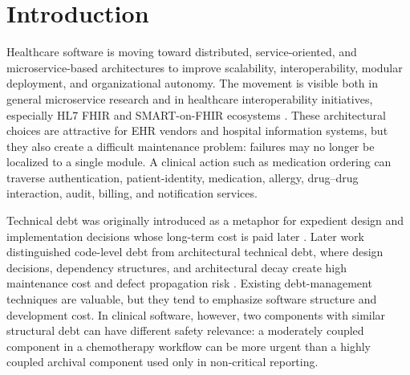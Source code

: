 \documentclass[english,preprint]{elsarticle}
\begin{document}
\begin{center}
\end{center}

\section{Introduction}\label{sec:introduction}

Healthcare software is moving toward distributed, service-oriented, and microservice-based architectures to improve scalability, interoperability, modular deployment, and organizational autonomy. The movement is visible both in general microservice research and in healthcare interoperability initiatives, especially HL7 FHIR and SMART-on-FHIR ecosystems \cite{Newman2015Microservices,Dragoni2017Microservices,Soldani2018PainsGains,Taibi2017Microservices,FHIR2026,Mandel2016SMART}. These architectural choices are attractive for EHR vendors and hospital information systems, but they also create a difficult maintenance problem: failures may no longer be localized to a single module. A clinical action such as medication ordering can traverse authentication, patient-identity, medication, allergy, drug--drug interaction, audit, billing, and notification services.

Technical debt was originally introduced as a metaphor for expedient design and implementation decisions whose long-term cost is paid later \cite{Cunningham1992WyCash,Kruchten2012TechnicalDebt,Li2015TechnicalDebt}. Later work distinguished code-level debt from architectural technical debt, where design decisions, dependency structures, and architectural decay create high maintenance cost and defect propagation risk \cite{Alves2016TechnicalDebt,Rios2018TertiaryStudy,Verdecchia2021Landscape,Martini2015ATD,Xiao2016ArchitecturalDebt,Soliman2021DesignDecisions,Verdecchia2021Theory}. Existing debt-management techniques are valuable, but they tend to emphasize software structure and development cost. In clinical software, however, two components with similar structural debt can have different safety relevance: a moderately coupled component in a chemotherapy workflow can be more urgent than a highly coupled archival component used only in non-critical reporting.
\end{document}
